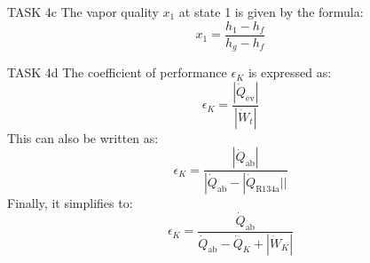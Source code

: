 TASK 4c  
The vapor quality \( x_1 \) at state 1 is given by the formula:  
\[
x_1 = \frac{h_1 - h_f}{h_g - h_f}
\]  

TASK 4d  
The coefficient of performance \( \epsilon_K \) is expressed as:  
\[
\epsilon_K = \frac{|\dot{Q}_{\text{ev}}|}{|\dot{W}_t|}
\]  
This can also be written as:  
\[
\epsilon_K = \frac{|\dot{Q}_{\text{ab}}|}{|\dot{Q}_{\text{ab}} - |\dot{Q}_{\text{R134a}}||}
\]  
Finally, it simplifies to:  
\[
\epsilon_K = \frac{\dot{Q}_{\text{ab}}}{\dot{Q}_{\text{ab}} - \dot{Q}_K + |\dot{W}_K|}
\]  